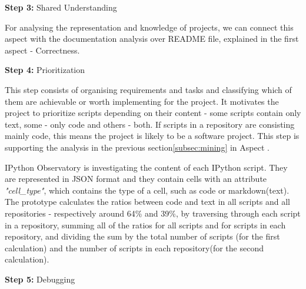 \vspace{5mm}
\begin{mdframed}
\vspace{1px}
\textbf{Step 3:} Shared Understanding
\vspace{1px}
\end{mdframed}
\vspace{2mm}

For analysing the representation and knowledge of projects, we can connect this aspect with the documentation analysis over README file, explained in the first aspect - Correctness.


\vspace{5mm}
\begin{mdframed}
\vspace{1px}
\textbf{Step 4:} Prioritization
\vspace{1px}
\end{mdframed}
\vspace{2mm}

This step consists of organising requirements and tasks and classifying which of them are achievable or worth
implementing for the project. It motivates the project to prioritize scripts depending on their content - some scripts contain only text, some - only code and others - both. If scripts in a repository are consisting mainly code, this means the project is likely to be a software project. This step is supporting the analysis in the previous section\ref{subsec:mining} in Aspect . 

IPython Observatory is investigating the content of each IPython script. They are represented in JSON format\cite{json} and they contain cells with an attribute \textit{"cell\_type"}, which contains the type of a cell, such as code or markdown(text). The prototype calculates the ratios between code and text in all scripts and all repositories - respectively around 64\% and 39\%, by traversing through each script in a repository, summing all of the ratios for all scripts and for scripts in each repository, and dividing the sum by the total number of scripts (for the first calculation) and the number of scripts in each repository(for the second calculation). 

\vspace{5mm}
\begin{mdframed}
\vspace{1px}
\textbf{Step 5:} Debugging
\vspace{1px}
\end{mdframed}

